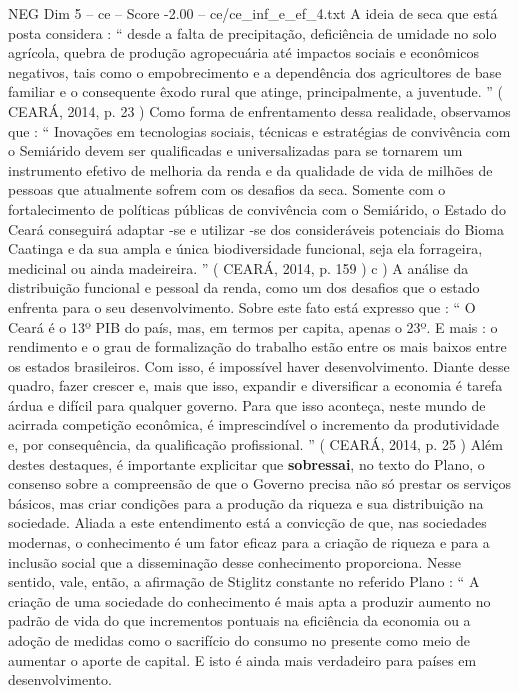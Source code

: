 \begin{textsample}{NEG Dim 5 – ce – Score -2.00 – ce/ce\_inf\_e\_ef\_4.txt}
A ideia de seca que está posta considera : “ desde a falta de precipitação, deficiência de umidade no solo agrícola, quebra de produção agropecuária até impactos sociais e econômicos negativos, tais como o empobrecimento e a dependência dos agricultores de base familiar e o consequente êxodo rural que atinge, principalmente, a juventude. ” ( CEARÁ, 2014, p. 23 ) Como forma de enfrentamento dessa realidade, observamos que : “ Inovações em tecnologias sociais, técnicas e estratégias de convivência com o Semiárido devem ser qualificadas e universalizadas para se tornarem um instrumento efetivo de melhoria da renda e da qualidade de vida de milhões de pessoas que atualmente sofrem com os desafios da seca.
Somente com o fortalecimento de políticas públicas de convivência com o Semiárido, o Estado do Ceará conseguirá adaptar -se e utilizar -se dos consideráveis potenciais do Bioma Caatinga e da sua ampla e única biodiversidade funcional, seja ela forrageira, medicinal ou ainda madeireira. ” ( CEARÁ, 2014, p. 159 ) c ) A análise da distribuição funcional e pessoal da renda, como um dos desafios que o estado enfrenta para o seu desenvolvimento.
Sobre este fato está expresso que : “ O Ceará é o 13º PIB do país, mas, em termos per capita, apenas o 23º.
E mais : o rendimento e o grau de formalização do trabalho estão entre os mais baixos entre os estados brasileiros.
Com isso, é impossível haver desenvolvimento.
Diante desse quadro, fazer crescer e, mais que isso, expandir e diversificar a economia é tarefa árdua e difícil para qualquer governo.
Para que isso aconteça, neste mundo de acirrada competição econômica, é imprescindível o incremento da produtividade e, por consequência, da qualificação profissional. ” ( CEARÁ, 2014, p. 25 ) Além destes destaques, é importante explicitar que \textbf{sobressai}, no texto do Plano, o consenso sobre a compreensão de que o Governo precisa não só prestar os serviços básicos, mas criar condições para a produção da riqueza e sua distribuição na sociedade.
Aliada a este entendimento está a convicção de que, nas sociedades modernas, o conhecimento é um fator eficaz para a criação de riqueza e para a inclusão social que a disseminação desse conhecimento proporciona.
Nesse sentido, vale, então, a afirmação de Stiglitz constante no referido Plano : “ A criação de uma sociedade do conhecimento é mais apta a produzir aumento no padrão de vida do que incrementos pontuais na eficiência da economia ou a adoção de medidas como o sacrifício do consumo no presente como meio de aumentar o aporte de capital.
E isto é ainda mais verdadeiro para países em desenvolvimento.

\end{textsample}
